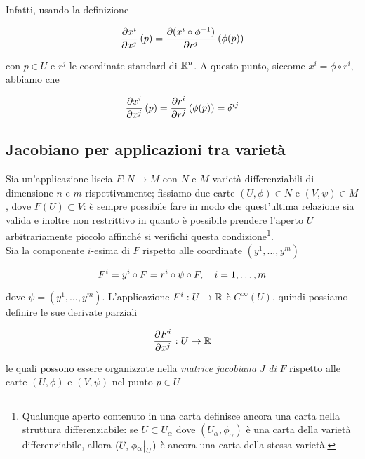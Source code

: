 Infatti, usando la definizione

\begin{equation}
	\pdv{x^{i}}{x^{j}} \, (p) = \pdv{(x^{i} \circ \phi^{-1})}{r^{j}} \, (\phi(p))
\end{equation}

con $ p \in U $ e $ r^{j} $ le coordinate standard di $ \mathbb{R}^{n} $. A questo punto, siccome $ x^{i} = \phi \circ r^{i} $, abbiamo che

\begin{equation}
	\pdv{x^{i}}{x^{j}} \, (p) = \pdv{r^{i}}{r^{j}} \, (\phi(p)) = \delta^{ij}
\end{equation}

\subsection{Jacobiano per applicazioni tra varietà}

Sia un'applicazione liscia $ F : N \to M $ con $ N $ e $ M $ varietà differenziabili di dimensione $ n $ e $ m $ rispettivamente; fissiamo due carte $ (U,\phi) \in N $ e $ (V,\psi) \in M $, dove $ F(U) \subset V $: è sempre possibile fare in modo che quest'ultima relazione sia valida e inoltre non restrittivo in quanto è possibile prendere l'aperto $ U $ arbitrariamente piccolo affinché si verifichi questa condizione\footnote{%
	Qualunque aperto contenuto in una carta definisce ancora una carta nella struttura differenziabile: se $ U \subset U_{\alpha} $ dove $ (U_{\alpha},\phi_{\alpha}) $ è una carta della varietà differenziabile, allora $ (U, \eval{\phi_{\alpha}}_{U}) $ è ancora una carta della stessa varietà.%
}.\\
Sia la componente $ i $-esima di $ F $ rispetto alle coordinate $ (y^{1},\dots,y^{m}) $

\begin{equation}
	F^{i} = y^{i} \circ F = r^{i} \circ \psi \circ F \qcomma i=1,\dots,m
\end{equation}

dove $ \psi = (y^{1},\dots,y^{m}) $. L'applicazione $ F^{i} : U \to \mathbb{R} $ è $ C^{\infty}(U) $, quindi possiamo definire le sue derivate parziali

\begin{equation}
	\pdv{F^{i}}{x^{j}} : U \to \mathbb{R}
\end{equation}

le quali possono essere organizzate nella \textit{matrice jacobiana} $ J $ \textit{di} $ F $ rispetto alle carte $ (U,\phi) $ e $ (V,\psi) $ nel punto $ p \in U $

